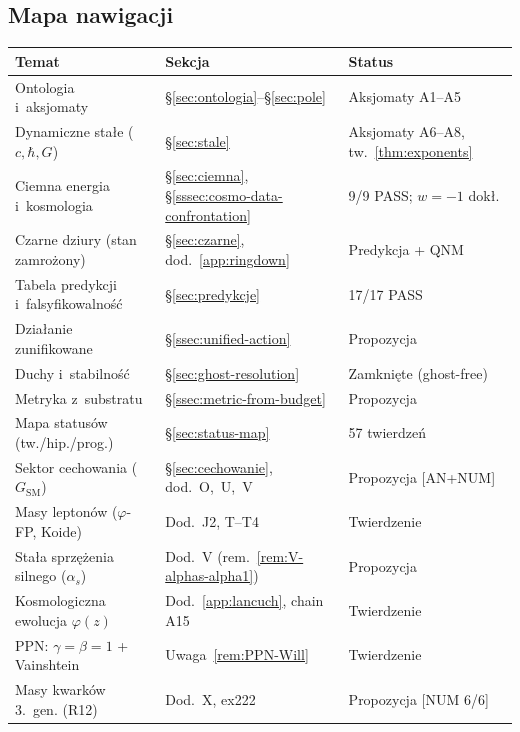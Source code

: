 

\subsection*{Mapa nawigacji}

\begin{center}\small
\begin{tabular}{@{}lll@{}}
\toprule
\textbf{Temat} & \textbf{Sekcja} & \textbf{Status} \\
\midrule
Ontologia i~aksjomaty & \S\ref{sec:ontologia}--\S\ref{sec:pole} & Aksjomaty A1--A5 \\
Dynamiczne sta\l{}e ($c, \hbar, G$) & \S\ref{sec:stale} & Aksjomaty A6--A8, tw.~\ref{thm:exponents} \\
Ciemna energia i~kosmologia & \S\ref{sec:ciemna}, \S\ref{sssec:cosmo-data-confrontation} & 9/9 PASS; $w = -1$ dok\l{}. \\
Czarne dziury (stan zamro\.zony) & \S\ref{sec:czarne}, dod.~\ref{app:ringdown} & Predykcja + QNM \\
Tabela predykcji i~falsyfikowalno\'s\'c & \S\ref{sec:predykcje} & 17/17 PASS \\
Dzia\l{}anie zunifikowane & \S\ref{ssec:unified-action} & Propozycja \\
Duchy i~stabilno\'s\'c & \S\ref{sec:ghost-resolution} & Zamkni\k{e}te (ghost-free) \\
Metryka z~substratu & \S\ref{ssec:metric-from-budget} & Propozycja \\
Mapa status\'ow (tw./hip./prog.) & \S\ref{sec:status-map} & 57 twierdze\'n \\
Sektor cechowania ($G_{\mathrm{SM}}$) & \S\ref{sec:cechowanie}, dod.~O,~U,~V & Propozycja [AN+NUM] \\
Masy lepton\'ow ($\varphi$-FP, Koide) & Dod.~J2, T--T4 & Twierdzenie \\
Sta\l{}a sprz\k{e}\.zenia silnego ($\alpha_s$) & Dod.~V (rem.~\ref{rem:V-alphas-alpha1}) & Propozycja \\
Kosmologiczna ewolucja $\varphi(z)$ & Dod.~\ref{app:lancuch}, chain A15 & Twierdzenie \\
PPN: $\gamma = \beta = 1$ + Vainshtein & Uwaga~\ref{rem:PPN-Will} & Twierdzenie \\
Masy kwark\'ow 3.\ gen. (R12) & Dod.~X, ex222 & Propozycja [NUM 6/6] \\

\end{tabular}
\end{center}
